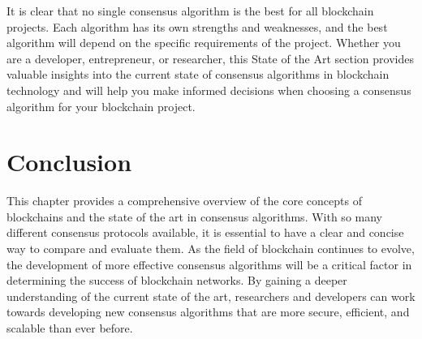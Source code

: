 It is clear that no single consensus algorithm is the best for all blockchain projects. Each algorithm has its own strengths and weaknesses, and the best algorithm will depend on the specific requirements of the project. Whether you are a developer, entrepreneur, or researcher, this State of the Art section provides valuable insights into the current state of consensus algorithms in blockchain technology and will help you make informed decisions when choosing a consensus algorithm for your blockchain project.

\section{Conclusion}
This chapter provides a comprehensive overview of the core concepts of blockchains and the state of the art in consensus algorithms. With so many different consensus protocols available, it is essential to have a clear and concise way to compare and evaluate them. As the field of blockchain continues to evolve, the development of more effective consensus algorithms will be a critical factor in determining the success of blockchain networks. By gaining a deeper understanding of the current state of the art, researchers and developers can work towards developing new consensus algorithms that are more secure, efficient, and scalable than ever before.
